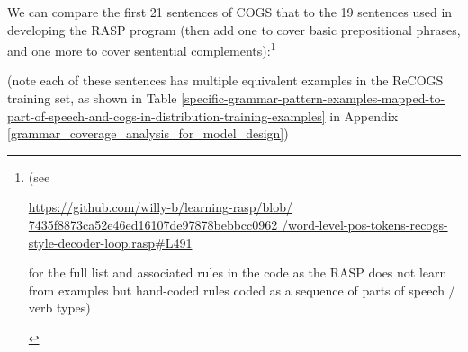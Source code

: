 \documentclass[11pt]{article}
\begin{document}
We can compare the first 21 sentences of COGS that to the 19 sentences used in developing the RASP program (then add one to cover basic prepositional phrases, and one more to cover sentential complements):\footnote{\begin{footnotesize}(see 

\href{https://github.com/willy-b/learning-rasp/blob/7435f8873ca52e46ed16107de97878bebbcc0962/word-level-pos-tokens-recogs-style-decoder-loop.rasp\#L491}{https://github.com/willy-b/learning-rasp/blob/
7435f8873ca52e46ed16107de97878bebbcc0962
/word-level-pos-tokens-recogs-style-decoder-loop.rasp\#L491}

for the full list and associated rules in the code as the RASP does not learn from examples but hand-coded rules coded as a sequence of parts of speech / verb types)\end{footnotesize}}

(note each of these sentences has multiple equivalent examples in the ReCOGS training set, as shown in Table \ref{specific-grammar-pattern-examples-mapped-to-part-of-speech-and-cogs-in-distribution-training-examples} in Appendix \ref{grammar_coverage_analysis_for_model_design})
\end{document}
